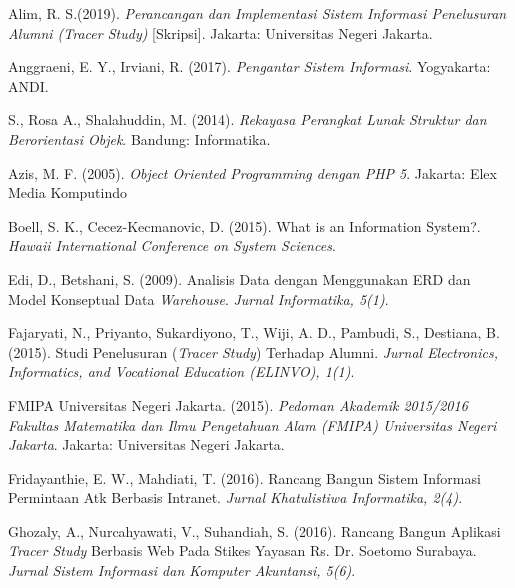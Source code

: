 \documentclass{jtetiskripsi}
\begin{document}
%
\begin{thebibliography}{99}
	
 Alim, R. S.(2019). \textit{Perancangan dan Implementasi Sistem Informasi Penelusuran Alumni (Tracer Study)} [Skripsi]. Jakarta: Universitas Negeri Jakarta.

 Anggraeni, E. Y., Irviani, R. (2017). \textit{Pengantar Sistem Informasi}. Yogyakarta: ANDI.

 S., Rosa A., Shalahuddin, M. (2014). \textit{Rekayasa Perangkat Lunak Struktur dan Berorientasi Objek}. Bandung: Informatika.

 Azis, M. F. (2005). \textit{Object Oriented Programming dengan PHP 5}. Jakarta: Elex Media Komputindo

 Boell, S. K., Cecez-Kecmanovic, D. (2015). What is an Information System?. \textit{Hawaii International Conference on System Sciences}.

 Edi, D., Betshani, S. (2009). Analisis Data dengan Menggunakan ERD dan Model Konseptual Data \textit{Warehouse}. \textit{Jurnal Informatika, 5(1)}.

 Fajaryati, N., Priyanto, Sukardiyono, T., Wiji, A. D., Pambudi, S., Destiana, B. (2015). Studi Penelusuran (\textit{Tracer Study}) Terhadap Alumni. \textit{Jurnal Electronics, Informatics, and Vocational Education (ELINVO), 1(1)}.

 FMIPA Universitas Negeri Jakarta. (2015). \textit{Pedoman Akademik 2015/2016 Fakultas Matematika dan Ilmu Pengetahuan Alam (FMIPA) Universitas Negeri Jakarta}. Jakarta: Universitas Negeri Jakarta.

 Fridayanthie, E. W., Mahdiati, T. (2016). Rancang Bangun Sistem Informasi Permintaan Atk Berbasis Intranet. \textit{Jurnal Khatulistiwa Informatika, 2(4)}.

 Ghozaly, A., Nurcahyawati, V., Suhandiah, S. (2016). Rancang Bangun Aplikasi \textit{Tracer Study} Berbasis Web Pada Stikes Yayasan Rs. Dr. Soetomo Surabaya. \textit{Jurnal Sistem Informasi dan Komputer Akuntansi, 5(6)}.


\end{thebibliography}
\end{document}
